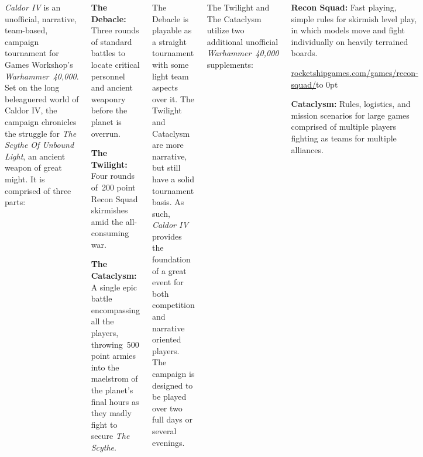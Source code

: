 \clearpage
{}

\begin{columns}
  

  \emph{Caldor IV} is an unofficial, narrative, team-based, campaign
  tournament for Games Workshop's \emph{Warhammer~40,000}.  Set on the
  long beleaguered world of Caldor IV, the campaign chronicles the
  struggle for \emph{The Scythe Of Unbound Light}, an ancient weapon
  of great might.  It is comprised of three parts:

\begin{squishitemize}
\item \textbf{The Debacle:} Three rounds of standard battles to locate
  critical personnel and ancient weaponry before the planet is
  overrun.

\item \textbf{The Twilight:} Four rounds of~200 point Recon Squad
  skirmishes amid the all-consuming war.

\item \textbf{The Cataclysm:} A single epic battle encompassing all
  the players, throwing~500 point armies into the maelstrom of the
  planet's final hours as they madly fight to secure \emph{The
    Scythe}.
\end{squishitemize}

The Debacle is playable as a straight tournament with some light team
aspects over it.  The Twilight and Cataclysm are more narrative, but
still have a solid tournament basis.  As such, \emph{Caldor IV}
provides the foundation of a great event for both competition and
narrative oriented players.  The campaign is designed to be played
over two full days or several evenings.

The Twilight and The Cataclysm utilize two additional unofficial
\emph{Warhammer~40,000} supplements:

\begin{squishitemize}
\item \textbf{Recon Squad:} Fast playing, simple rules for skirmish
  level play, in which models move and fight
  individually on heavily terrained boards.

\hfill\url{rocketshipgames.com/games/recon-squad/}\hfill\hbox to 0pt{}

\item \textbf{Cataclysm:} Rules, logistics, and mission scenarios for
  large games comprised of multiple players fighting as teams for
  multiple alliances.


\end{squishitemize}
\end{columns}
